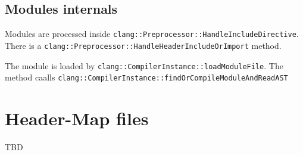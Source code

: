 \subsection{Modules internals}
Modules are processed inside
\texttt{clang::Preprocessor::HandleIncludeDirective}. There
is a \texttt{clang::Preprocessor::HandleHeaderIncludeOrImport} method. 

The module is loaded by
\texttt{clang::CompilerInstance::loadModuleFile}. The method caalls
 \texttt{clang::CompilerInstance::findOrCompileModuleAndReadAST}

% 

\section{Header-Map files}
TBD
